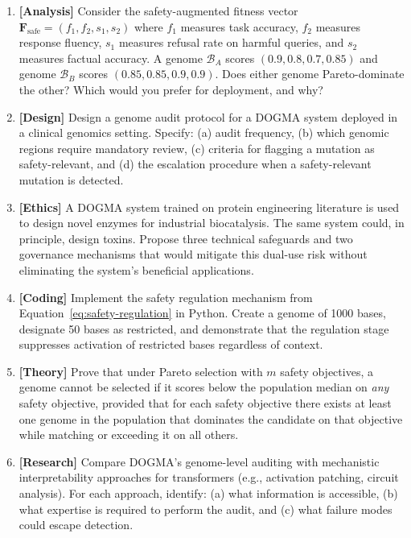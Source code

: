 \begin{enumerate}[label=\textbf{17.\arabic*.}, leftmargin=2.5em]

\item \textbf{[Analysis]} Consider the safety-augmented fitness vector $\mathbf{F}_{\text{safe}} = (f_1, f_2, s_1, s_2)$ where $f_1$ measures task accuracy, $f_2$ measures response fluency, $s_1$ measures refusal rate on harmful queries, and $s_2$ measures factual accuracy. A genome $\mathcal{B}_A$ scores $(0.9, 0.8, 0.7, 0.85)$ and genome $\mathcal{B}_B$ scores $(0.85, 0.85, 0.9, 0.9)$. Does either genome Pareto-dominate the other? Which would you prefer for deployment, and why?

\item \textbf{[Design]} Design a genome audit protocol for a DOGMA system deployed in a clinical genomics setting. Specify: (a) audit frequency, (b) which genomic regions require mandatory review, (c) criteria for flagging a mutation as safety-relevant, and (d) the escalation procedure when a safety-relevant mutation is detected.

\item \textbf{[Ethics]} A DOGMA system trained on protein engineering literature is used to design novel enzymes for industrial biocatalysis. The same system could, in principle, design toxins. Propose three technical safeguards and two governance mechanisms that would mitigate this dual-use risk without eliminating the system's beneficial applications.

\item \textbf{[Coding]} Implement the safety regulation mechanism from Equation~\ref{eq:safety-regulation} in Python. Create a genome of 1000 bases, designate 50 bases as restricted, and demonstrate that the regulation stage suppresses activation of restricted bases regardless of context.

\item \textbf{[Theory]} Prove that under Pareto selection with $m$ safety objectives, a genome cannot be selected if it scores below the population median on \emph{any} safety objective, provided that for each safety objective there exists at least one genome in the population that dominates the candidate on that objective while matching or exceeding it on all others.

\item \textbf{[Research]} Compare DOGMA's genome-level auditing with mechanistic interpretability approaches for transformers (e.g., activation patching, circuit analysis). For each approach, identify: (a) what information is accessible, (b) what expertise is required to perform the audit, and (c) what failure modes could escape detection.


\end{enumerate}
